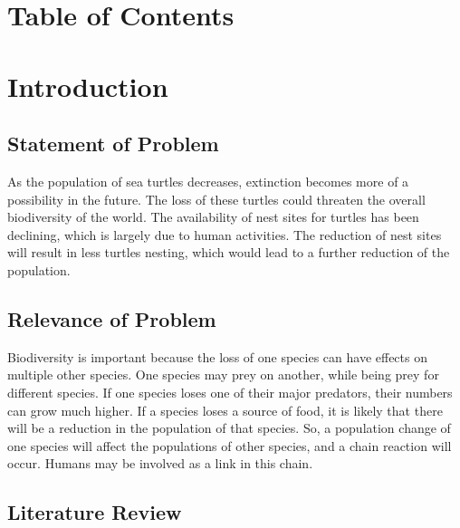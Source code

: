 \documentclass[
]{article}
\begin{document}
\hypertarget{table-of-contents}{%
\section*{Table of Contents}\label{table-of-contents}}

\hypertarget{introduction}{%
\section{Introduction}\label{introduction}}

\hypertarget{statement-of-problem}{%
\subsection{Statement of Problem}\label{statement-of-problem}}

As the population of sea turtles decreases, extinction becomes more of a possibility in the future. The loss of these turtles could threaten the overall biodiversity of the world. The availability of nest sites for turtles has been declining, which is largely due to human activities. The reduction of nest sites will result in less turtles nesting, which would lead to a further reduction of the population.

\hypertarget{relevance-of-problem}{%
\subsection{Relevance of Problem}\label{relevance-of-problem}}

Biodiversity is important because the loss of one species can have effects on multiple other species. One species may prey on another, while being prey for different species. If one species loses one of their major predators, their numbers can grow much higher. If a species loses a source of food, it is likely that there will be a reduction in the population of that species. So, a population change of one species will affect the populations of other species, and a chain reaction will occur. Humans may be involved as a link in this chain.

\hypertarget{literature-review}{%
\subsection{Literature Review}\label{literature-review}}
\end{document}
